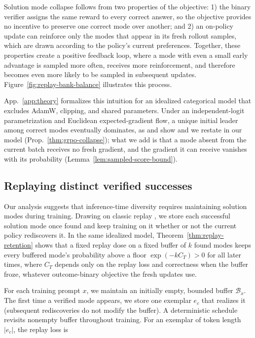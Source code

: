 \documentclass{article}
\newcommand{\1}{\mathbf 1}
\theoremstyle{remark}
\theoremstyle{definition}
\theoremstyle{plain}
\begin{document}
Solution mode collapse follows from two properties of the objective:
1) the binary verifier assigns the same reward to every correct answer, so the objective provides no incentive to preserve one correct mode over another; and 2) an on-policy update can reinforce only the modes that appear in its fresh rollout samples, which are drawn according to the policy's current preferences. Together, these properties create a positive feedback loop, where a mode with even a small early advantage is sampled more often, receives more reinforcement, and therefore becomes even more likely to be sampled in subsequent updates. Figure~\ref{fig:replay-bank-balance} illustrates this process.

App.~\ref{app:theory} formalizes this intuition for an idealized categorical model that excludes AdamW, clipping, and shared parameters. Under an independent-logit parametrization and Euclidean expected-gradient flow, a unique initial leader among correct modes eventually dominates, as \citet{sinha2026expected} and \citet{lochab2026ucpo} show and we restate in our model (Prop.~\ref{thm:grpo-collapse}); what we add is that a mode absent from the current batch receives no fresh gradient, and the gradient it can receive vanishes with its probability (Lemma~\ref{lem:sampled-score-bound}).

\subsection{Replaying distinct verified successes}
\label{sec:replay}

Our analysis suggests that inference-time diversity requires maintaining solution modes during training.
Drawing on classic replay \citep{lin1992selfimproving, DBLP:journals/corr/MnihKSGAWR13, rolnick2019replay}, we store each successful solution mode once found and keep training on it whether or not the current policy rediscovers it.
In the same idealized model, Theorem~\ref{thm:replay-retention} shows that a fixed replay dose on a fixed buffer of $k$ found modes keeps every buffered mode's probability above a floor $\exp(-kC_T)>0$ for all later times, where $C_T$ depends only on the replay loss and correctness when the buffer froze, whatever outcome-binary objective the fresh updates use.

For each training prompt $x$, we maintain an initially empty, bounded buffer $\mathcal B_x$.
The first time a verified mode appears, we store one exemplar $e_c$ that realizes it (subsequent rediscoveries do not modify the buffer).
A deterministic schedule revisits nonempty buffer throughout training.
For an exemplar of token length $|e_c|$, the replay loss is
\end{document}
